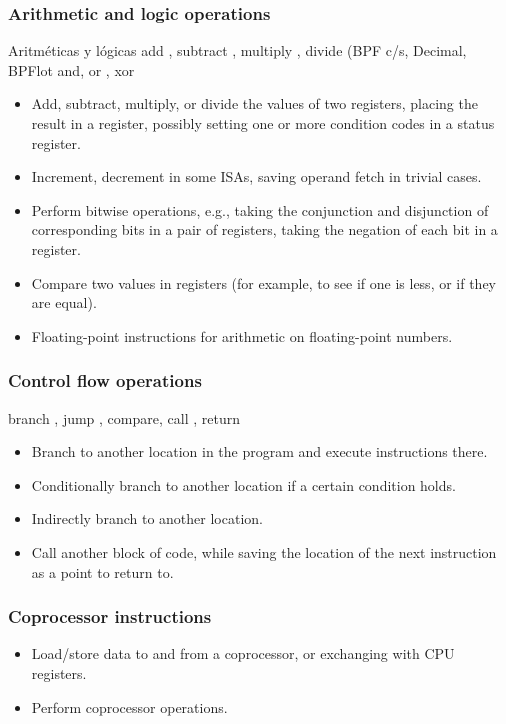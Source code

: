 \subsubsection{Arithmetic and logic operations}
Aritméticas y lógicas add , subtract , multiply , divide (BPF c/s, Decimal, BPFlot and, or , xor
\begin{itemize}
	\item Add, subtract, multiply, or divide the values of two registers, placing the result in a register, possibly setting one or more condition codes in a status register.
	\item Increment, decrement in some ISAs, saving operand fetch in trivial cases.
	\item Perform bitwise operations, e.g., taking the conjunction and disjunction of corresponding bits in a pair of registers, taking the negation of each bit in a register.
	\item Compare two values in registers (for example, to see if one is less, or if they are equal).
	\item Floating-point instructions for arithmetic on floating-point numbers.
\end{itemize}

\subsubsection{Control flow operations}
branch , jump , compare, call , return
\begin{itemize}
	\item Branch to another location in the program and execute instructions there.
	\item Conditionally branch to another location if a certain condition holds.
	\item Indirectly branch to another location.
	\item Call another block of code, while saving the location of the next instruction as a point to return to.
\end{itemize}

\subsubsection{Coprocessor instructions}
\begin{itemize}
	\item Load/store data to and from a coprocessor, or exchanging with CPU registers.
	\item Perform coprocessor operations.
\end{itemize}


